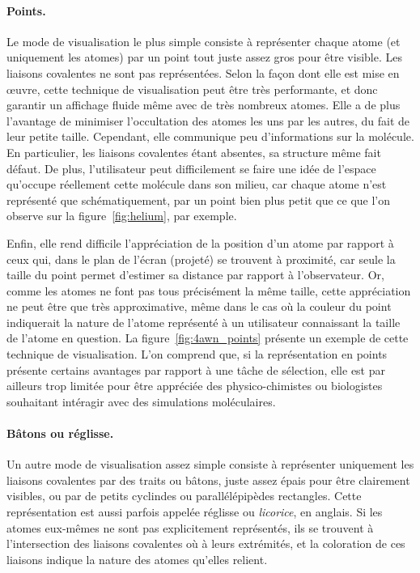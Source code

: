 	\paragraph{Points.} Le mode de visualisation le plus simple consiste à représenter chaque atome (et uniquement les atomes) par un point tout juste assez gros pour être visible. Les liaisons covalentes ne sont pas représentées. Selon la façon dont elle est mise en œuvre, cette technique de visualisation peut être très performante, et donc garantir un affichage fluide même avec de très nombreux atomes. Elle a de plus l'avantage de minimiser l'occultation des atomes les uns par les autres, du fait de leur petite taille. Cependant, elle communique peu d'informations sur la molécule. En particulier, les liaisons covalentes étant absentes, sa structure même fait défaut. De plus, l'utilisateur peut difficilement se faire une idée de l'espace qu'occupe réellement cette molécule dans son milieu, car chaque atome n'est représenté que schématiquement, par un point bien plus petit que ce que l'on observe sur la figure~\ref{fig:helium}, par exemple.
		
	Enfin, elle rend difficile l'appréciation de la position d'un atome par rapport à ceux qui, dans le plan de l'écran (projeté) se trouvent à proximité, car seule la taille du point permet d'estimer sa distance par rapport à l'observateur. Or, comme les atomes ne font pas tous précisément la même taille, cette appréciation ne peut être que très approximative, même dans le cas où la couleur du point indiquerait la nature de l'atome représenté à un utilisateur connaissant la taille de l'atome en question. La figure~\ref{fig:4awn_points} présente un exemple de cette technique de visualisation. L'on comprend que, si la représentation en points présente certains avantages par rapport à une tâche de sélection, elle est par ailleurs trop limitée pour être appréciée des physico-chimistes ou biologistes souhaitant intéragir avec des simulations moléculaires.
	    
	\paragraph{Bâtons ou réglisse.} Un autre mode de visualisation assez simple consiste à représenter uniquement les liaisons covalentes par des traits ou bâtons, juste assez épais pour être clairement visibles, ou par de petits cyclindes ou parallélépipèdes rectangles. Cette représentation est aussi parfois appelée \og réglisse \fg{} ou \emph{licorice}, en anglais. Si les atomes eux-mêmes ne sont pas explicitement représentés, ils se trouvent à l'intersection des liaisons covalentes où à leurs extrémités, et la coloration de ces liaisons indique la nature des atomes qu'elles relient.
		
